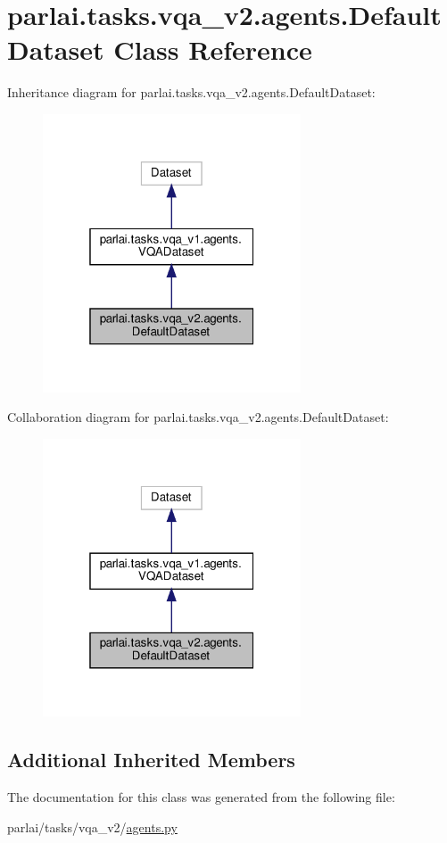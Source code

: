 \hypertarget{classparlai_1_1tasks_1_1vqa__v2_1_1agents_1_1DefaultDataset}{}\section{parlai.\+tasks.\+vqa\+\_\+v2.\+agents.\+Default\+Dataset Class Reference}
\label{classparlai_1_1tasks_1_1vqa__v2_1_1agents_1_1DefaultDataset}


Inheritance diagram for parlai.\+tasks.\+vqa\+\_\+v2.\+agents.\+Default\+Dataset\+:
\nopagebreak
\begin{figure}[H]
\begin{center}
\leavevmode
\includegraphics[width=217pt]{classparlai_1_1tasks_1_1vqa__v2_1_1agents_1_1DefaultDataset__inherit__graph}
\end{center}
\end{figure}


Collaboration diagram for parlai.\+tasks.\+vqa\+\_\+v2.\+agents.\+Default\+Dataset\+:
\nopagebreak
\begin{figure}[H]
\begin{center}
\leavevmode
\includegraphics[width=217pt]{classparlai_1_1tasks_1_1vqa__v2_1_1agents_1_1DefaultDataset__coll__graph}
\end{center}
\end{figure}
\subsection*{Additional Inherited Members}


The documentation for this class was generated from the following file\+:\begin{DoxyCompactItemize}
\item 
parlai/tasks/vqa\+\_\+v2/\hyperlink{parlai_2tasks_2vqa__v2_2agents_8py}{agents.\+py}\end{DoxyCompactItemize}
